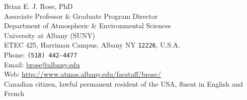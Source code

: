 \documentclass[11pt, letterpaper]{article} %
\begin{document}
\thispagestyle{empty}


{\LARGE Brian E. J. Rose, PhD}\\[0.2 cm] %
Associate Professor \& Graduate Program Director \\
Department of Atmospheric \& Environmental Sciences \\
University at Albany (SUNY) \\
ETEC 425, Harriman Campus, Albany NY \texttt{12226}, U.S.A.\\[.1cm]
Phone: \texttt{(518) 442-4477}\\ %
Email: \href{mailto:brose@albany.edu}{brose@albany.edu}\\ %
Web: \href{http://www.atmos.albany.edu/facstaff/brose/}{http://www.atmos.albany.edu/facstaff/brose/}\\ [.2cm]%
Canadian citizen, lawful permanent resident of the USA, fluent in English and French








\end{document}
